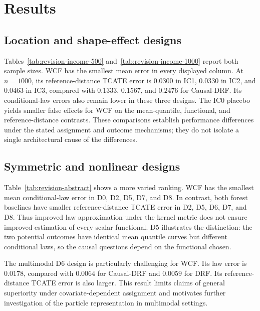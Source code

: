 \section{Results}\label{sec:results}

\subsection{Location and shape-effect designs}

Tables~\ref{tab:revision-income-500} and~\ref{tab:revision-income-1000} report both sample sizes. WCF has the smallest mean error in every displayed column. At $n=1000$, its reference-distance TCATE error is $0.0300$ in IC1, $0.0330$ in IC2, and $0.0463$ in IC3, compared with $0.1333$, $0.1567$, and $0.2476$ for Causal-DRF. Its conditional-law errors also remain lower in these three designs. The IC0 placebo yields smaller false effects for WCF on the mean-quantile, functional, and reference-distance contrasts. These comparisons establish performance differences under the stated assignment and outcome mechanisms; they do not isolate a single architectural cause of the differences.




\subsection{Symmetric and nonlinear designs}

Table~\ref{tab:revision-abstract} shows a more varied ranking. WCF has the smallest mean conditional-law error in D0, D2, D5, D7, and D8. In contrast, both forest baselines have smaller reference-distance TCATE error in D2, D5, D6, D7, and D8. Thus improved law approximation under the kernel metric does not ensure improved estimation of every scalar functional. D5 illustrates the distinction: the two potential outcomes have identical mean quantile curves but different conditional laws, so the causal questions depend on the functional chosen.

The multimodal D6 design is particularly challenging for WCF. Its law error is $0.0178$, compared with $0.0064$ for Causal-DRF and $0.0059$ for DRF. Its reference-distance TCATE error is also larger. This result limits claims of general superiority under covariate-dependent assignment and motivates further investigation of the particle representation in multimodal settings.

